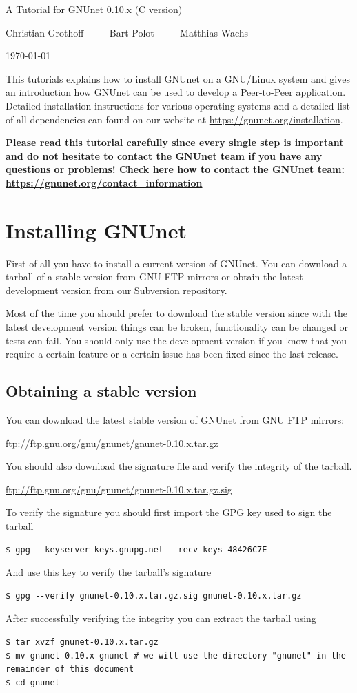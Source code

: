 \documentclass[10pt]{article}
\begin{document}
\begin{center}
\large {A Tutorial for GNUnet 0.10.x (C version)}

Christian Grothoff $\qquad$ Bart Polot $\qquad$ Matthias Wachs

\today
\end{center}
This tutorials explains how to install GNUnet on a GNU/Linux system and gives an introduction how
GNUnet can be used to develop a Peer-to-Peer application. Detailed installation instructions for
various operating systems and a detailed list of all dependencies can found on our website at
\url{https://gnunet.org/installation}.

\textbf{Please read this tutorial carefully since every single step is
  important and do not hesitate to contact the GNUnet team if you have
  any questions or problems! Check here how to contact the GNUnet
  team: \url{https://gnunet.org/contact_information}}


\section{Installing GNUnet}
First of all you have to install a current version of GNUnet. You can download a
tarball of a stable version from GNU FTP mirrors or obtain the latest development
version from our Subversion repository.

Most of the time you should prefer to download the stable version since with the
latest development version things can be broken, functionality can be changed or tests
can fail. You should only use the development version if you know that you require a
certain feature or a certain issue has been fixed since the last release.

\subsection{Obtaining a stable version}
You can download the latest stable version of GNUnet from GNU FTP mirrors:
\begin{center}
\url{ftp://ftp.gnu.org/gnu/gnunet/gnunet-0.10.x.tar.gz}
\end{center}
You should also download the signature file and verify the integrity of the tarball.
\begin{center}
\url{ftp://ftp.gnu.org/gnu/gnunet/gnunet-0.10.x.tar.gz.sig}
\end{center}
To verify the signature you should first import the GPG key used to sign the tarball
\begin{lstlisting}
$ gpg --keyserver keys.gnupg.net --recv-keys 48426C7E
\end{lstlisting}
And use this key to verify the tarball's signature
\begin{lstlisting}
$ gpg --verify gnunet-0.10.x.tar.gz.sig gnunet-0.10.x.tar.gz
\end{lstlisting}
After successfully verifying the integrity you can extract the tarball using
\begin{lstlisting}
$ tar xvzf gnunet-0.10.x.tar.gz
$ mv gnunet-0.10.x gnunet # we will use the directory "gnunet" in the remainder of this document
$ cd gnunet
\end{lstlisting}
\end{document}
